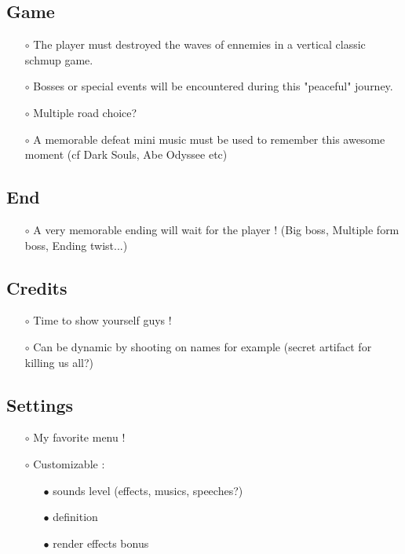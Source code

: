 \documentclass[12pt,a4paper]{article}
\begin{document}
    \subsection{Game}\label{sec:game}
        \begin{itemize}
            \item[$\circ$] The player must destroyed the waves of ennemies in a vertical classic schmup game.
            \item[$\circ$] Bosses or special events will be encountered during this "peaceful" journey.
            \item[$\circ$] Multiple road choice?
            \item[$\circ$] A memorable defeat mini music must be used to remember this awesome moment (cf Dark Souls, Abe Odyssee etc)
        \end{itemize}

    \subsection{End}
        \begin{itemize}
            \item[$\circ$] A very memorable ending will wait for the player ! (Big boss, Multiple form boss, Ending twist...)
        \end{itemize}
    \subsection{Credits}
        \begin{itemize}
            \item[$\circ$] Time to show yourself guys !
            \item[$\circ$] Can be dynamic by shooting on names for example (secret artifact for killing us all?)
        \end{itemize}
    
    \subsection{Settings}
        \begin{itemize}
            \item[$\circ$] My favorite menu !
            \item[$\circ$] Customizable :
            \begin{itemize}
                \item[$\bullet$] sounds level (effects, musics, speeches?)
                \item[$\bullet$] definition
                \item[$\bullet$] render effects bonus
            \end{itemize}
        \end{itemize}
\end{document}
